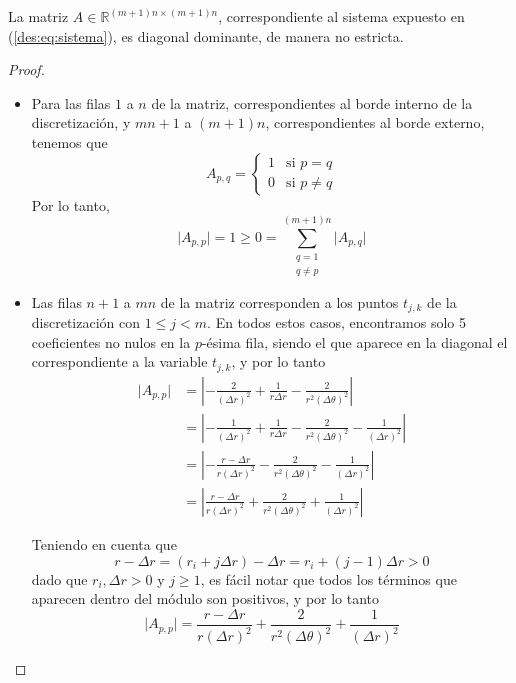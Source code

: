       \begin{prop} \label{prop:La matriz es diagonal dominante}
        La matriz $A \in \mathbb{R}^{(m+1)n \times (m+1)n}$, correspondiente al sistema expuesto en (\ref{des:eq:sistema}), es diagonal dominante, de manera no estricta.
      \end{prop}

      \begin{proof} \ 
        \begin{itemize}
          \item Para las filas $1$ a $n$ de la matriz, correspondientes al borde interno de la discretización, y $mn + 1 $ a $(m+1)n$, correspondientes al borde externo, tenemos que
            \[ A_{p,q} = \begin{cases}
              1 & \text{si $p = q$} \\
              0 & \text{si $p \neq q$}
            \end{cases} \]
          Por lo tanto,
            \[ \vert A_{p,p} \vert = 1 \geq 0 = \sum_{\substack{q=1 \\ q \neq p}}^{(m+1)n} \vert A_{p,q} \vert \]

          \item Las filas $n + 1$ a $mn$ de la matriz corresponden a los puntos $t_{j,k}$ de la discretización con $1 \leq j < m$. En todos estos casos, encontramos solo 5 coeficientes no nulos en la $p$-ésima fila, siendo el que aparece en la diagonal el correspondiente a la variable $t_{j,k}$, y por lo tanto
            \[ \begin{split}
              \vert A_{p,p} \vert &= \left \vert - \frac{2}{(\Delta r)^2} + \frac{1}{r \Delta r} - \frac{2}{r^2 (\Delta \theta)^2} \right \vert \\
              &= \left \vert - \frac{1}{(\Delta r)^2} + \frac{1}{r \Delta r} - \frac{2}{r^2 (\Delta \theta)^2} - \frac{1}{(\Delta r)^2} \right \vert \\
              &= \left \vert - \frac{r - \Delta r}{r (\Delta r)^2} - \frac{2}{r^2 (\Delta \theta)^2} - \frac{1}{(\Delta r)^2} \right \vert \\
              &= \left \vert \frac{r - \Delta r}{r (\Delta r)^2} + \frac{2}{r^2 (\Delta \theta)^2} + \frac{1}{(\Delta r)^2} \right \vert
            \end{split} \]

          Teniendo en cuenta que
            \[ r - \Delta r = (r_i + j \Delta r) - \Delta r = r_i + (j - 1) \Delta r > 0\]
          dado que $r_i, \Delta r > 0$ y $j \geq 1$, es fácil notar que todos los términos que aparecen dentro del módulo son positivos, y por lo tanto
            \[ \vert A_{p,p} \vert = \frac{r - \Delta r}{r (\Delta r)^2} + \frac{2}{r^2 (\Delta \theta)^2} + \frac{1}{(\Delta r)^2} \]


\end{itemize}
\end{proof}
